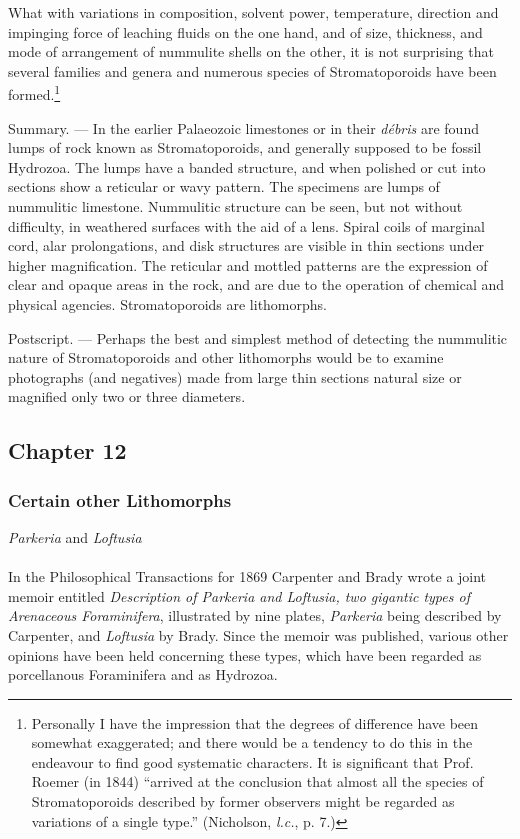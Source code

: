 \documentclass[a4paper, 12pt, oneside]{article}
\begin{document}
What with variations in composition, solvent power, temperature, direction and impinging force of leaching fluids on the one hand, and of size, thickness, and mode of arrangement of nummulite shells on the other, it is not surprising that several families and genera and numerous species of Stromatoporoids have been formed.\footnote{Personally I have the impression that the degrees of difference have been somewhat exaggerated; and there would be a tendency to do this in the endeavour to find good systematic characters. It is significant that Prof. Roemer (in 1844) ``arrived at the conclusion that almost all the species of Stromatoporoids described by former observers might be regarded as variations of a single type.'' (Nicholson, \emph{l.c.}, p. 7.)}

Summary. --- In the earlier Palaeozoic limestones or in their \emph{débris} are found lumps of rock known as Stromatoporoids, and generally supposed to be fossil Hydrozoa. The lumps have a banded structure, and when polished or cut into sections show a reticular or wavy pattern. The specimens are lumps of nummulitic limestone. Nummulitic structure can be seen, but not without difficulty, in weathered surfaces with the aid of a lens. Spiral coils of marginal cord, alar prolongations, and disk structures are visible in thin sections under higher magnification. The reticular and mottled patterns are the expression of clear and opaque areas in the rock, and are due to the operation of chemical and physical agencies. Stromatoporoids are lithomorphs.

Postscript. --- Perhaps the best and simplest method of detecting the nummulitic nature of Stromatoporoids and other lithomorphs would be to examine photographs (and negatives) made from large thin sections natural size or magnified only two or three diameters.
\clearpage
\subsection{Chapter 12}
\subsubsection{Certain other Lithomorphs}
\centerline{\emph{Parkeria} and \emph{Loftusia}}
\paragraph{}
In the Philosophical Transactions for 1869 Carpenter and Brady wrote a joint memoir entitled \emph{Description of \emph{Parkeria} and \emph{Loftusia}, two gigantic types of Arenaceous Foraminifera}, illustrated by nine plates, \emph{Parkeria} being described by Carpenter, and \emph{Loftusia} by Brady. Since the memoir was published, various other opinions have been held concerning these types, which have been regarded as porcellanous Foraminifera and as Hydrozoa.
\end{document}
